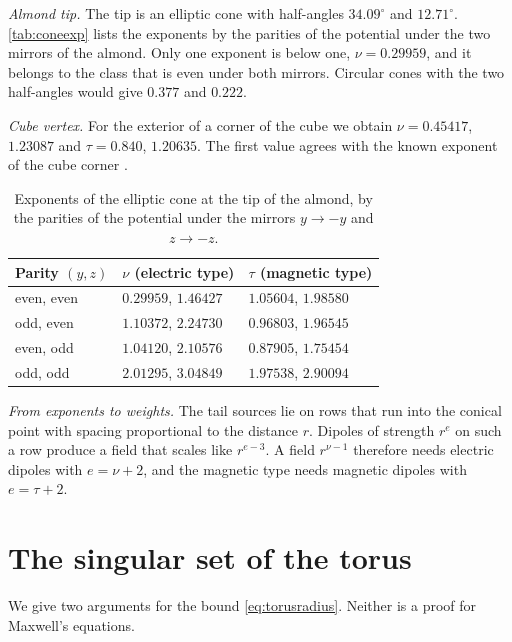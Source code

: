 \emph{Almond tip.} The tip is an elliptic cone with half-angles $34.09^\circ$ and $12.71^\circ$. \autoref{tab:coneexp} lists the exponents by the parities of the potential under the two mirrors of the almond. Only one exponent is below one, $\nu = 0.29959$, and it belongs to the class that is even under both mirrors. Circular cones with the two half-angles would give $0.377$ and $0.222$.

\emph{Cube vertex.} For the exterior of a corner of the cube we obtain $\nu = 0.45417$, $1.23087$ and $\tau = 0.840$, $1.20635$. The first value agrees with the known exponent of the cube corner \cite{fichera1975}.

\begin{table}[htbp]
  \centering
  \caption{Exponents of the elliptic cone at the tip of the almond, by the parities of the potential under the mirrors $y\to-y$ and $z\to-z$.}
  \label{tab:coneexp}
  \begin{tabular}{lll}
    \toprule
    Parity $(y,z)$ & $\nu$ (electric type) & $\tau$ (magnetic type) \\
    \midrule
    even, even & $\mathbf{0.29959}$, $1.46427$ & $1.05604$, $1.98580$ \\
    odd, even  & $1.10372$, $2.24730$ & $0.96803$, $1.96545$ \\
    even, odd  & $1.04120$, $2.10576$ & $0.87905$, $1.75454$ \\
    odd, odd   & $2.01295$, $3.04849$ & $1.97538$, $2.90094$ \\
    \bottomrule
  \end{tabular}
\end{table}

\emph{From exponents to weights.} The tail sources lie on rows that run into the conical point with spacing proportional to the distance $r$. Dipoles of strength $r^{e}$ on such a row produce a field that scales like $r^{e-3}$. A field $r^{\nu-1}$ therefore needs electric dipoles with $e = \nu+2$, and the magnetic type needs magnetic dipoles with $e = \tau+2$.

\section{The singular set of the torus}
\label{app:torus}

We give two arguments for the bound \eqref{eq:torusradius}. Neither is a proof for Maxwell's equations.

